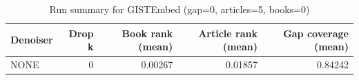 \begin{table}
\caption{Run summary for GISTEmbed (gap=0, articles=5, books=0)}
\label{tab:summary_gap0_gistembed_a5_b0}
\begin{tabular}{lrrrr}
\toprule
Denoiser & Drop k & Book rank (mean) & Article rank (mean) & Gap coverage (mean) \\
\midrule
NONE & 0 & 0.00267 & 0.01857 & 0.84242 \\
\bottomrule
\end{tabular}
\end{table}